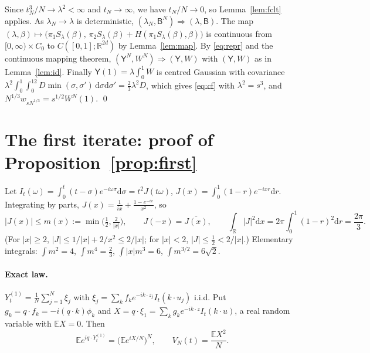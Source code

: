 \documentclass[11pt]{article}
\newcommand{\dd}{\mathrm{d}}
\newcommand{\E}{\mathbb{E}}
\newcommand{\R}{\mathbb{R}}
\newcommand{\sY}{\mathsf{Y}}
\newcommand{\sB}{\mathsf{B}}
\theoremstyle{remark}
\begin{document}
Since $t_N^3/N\to\lambda^2<\infty$ and $t_N\to\infty$, we have $t_N/N\to0$,
so Lemma~\ref{lem:fclt} applies. As $\lambda_N\to\lambda$ is deterministic,
$(\lambda_N,\sB^N)\Rightarrow(\lambda,\sB)$. The map
$(\lambda,\beta)\mapsto\bigl(\pi_1S_\lambda(\beta),\,
\pi_2S_\lambda(\beta)+H(\pi_1S_\lambda(\beta),\beta)\bigr)$ is continuous
from $[0,\infty)\times C_0$ to $C([0,1];\R^{2d})$ by Lemma~\ref{lem:map}.
By \eqref{eq:repr} and the continuous mapping theorem,
$(\sY^N,W^N)\Rightarrow(\sY,W)$ with $(\sY,W)$ as in Lemma~\ref{lem:id}.
Finally $\sY(1)=\lambda\int_0^1W$ is centred Gaussian with covariance
$\lambda^2\int_0^1\!\!\int_0^12D\min(\sigma,\sigma')\,\dd\sigma\dd\sigma'
=\tfrac23\lambda^2D$, which gives \eqref{eq:cf} with $\lambda^2=s^3$, and
$N^{1/3}w_{sN^{1/3}}=s^{1/2}W^N(1)$. \qed

\section{The first iterate: proof of Proposition~\ref{prop:first}}

Let $I_t(\omega)=\int_0^t(t-\sigma)e^{-i\omega\sigma}\dd\sigma=t^2J(t\omega)$,
$J(x)=\int_0^1(1-r)e^{-ixr}\dd r$. Integrating by parts,
$J(x)=\frac{1}{ix}+\frac{1-e^{-ix}}{x^2}$, so
\begin{equation}
  |J(x)|\le m(x):=\min\bigl(\tfrac12,\tfrac2{|x|}\bigr),\qquad
  J(-x)=\overline{J(x)},\qquad \int_\R|J|^2\dd x=2\pi\int_0^1(1-r)^2\dd r
  =\frac{2\pi}{3}.
  \label{eq:J}
\end{equation}
(For $|x|\ge2$, $|J|\le1/|x|+2/x^2\le2/|x|$; for $|x|<2$,
$|J|\le\frac12<2/|x|$.) Elementary integrals:
$\int m^2=4$, $\int m^4=\frac23$, $\int|x|m^3=6$,
$\int m^{3/2}=6\sqrt2$.

\paragraph{Exact law.} $Y^{(1)}_t=\frac1N\sum_{j=1}^N\xi_j$ with
$\xi_j=\sum_kf_ke^{-ik\cdot z_j}I_t(k\cdot u_j)$ i.i.d. Put
$g_k=q\cdot f_k=-i(q\cdot k)\phi_k$ and
$X=q\cdot\xi_1=\sum_kg_ke^{-ik\cdot z}I_t(k\cdot u)$, a real random variable
with $\E X=0$. Then
\begin{equation}
  \E e^{iq\cdot Y^{(1)}_t}=\bigl(\E e^{iX/N}\bigr)^N,\qquad
  V_N(t)=\frac{\E X^2}{N}.
  \label{eq:product}
\end{equation}
\end{document}
